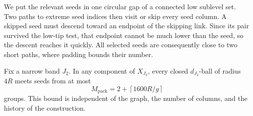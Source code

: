 We put the relevant seeds in one circular gap of a connected low sublevel
set. Two paths to extreme seed indices then visit or skip every seed
column. A skipped seed must descend toward an endpoint of the skipping
link. Since its pair survived the low-tip test, that endpoint cannot be
much lower than the seed, so the descent reaches it quickly. All selected
seeds are consequently close to two short paths, where padding bounds
their number.

\begin{proposition}
\label{pack:bound}
Fix a narrow band $J_2$.  In any component of $X_{J_2}$, every
closed $d_{J_2}$-ball of radius $4R$ meets seeds from at most
\begin{equation}
 M_{\mathrm{pack}}=2+\left\lceil1600R/g\right\rceil
 \label{pack:number}
\end{equation}
groups.  This bound is independent of the graph, the number of
columns, and the history of the construction.
\end{proposition}

